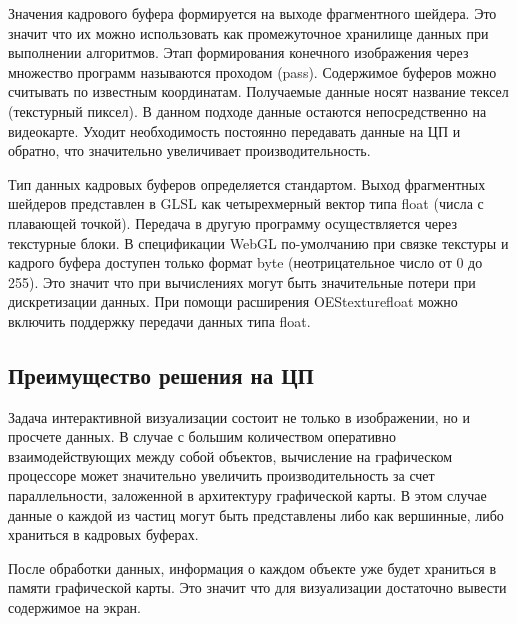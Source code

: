 Значения кадрового буфера формируется на выходе фрагментного шейдера. Это значит что их можно 
использовать как промежуточное хранилище данных при выполнении алгоритмов. Этап формирования 
конечного изображения через множество программ называются проходом (pass). Содержимое буферов 
можно считывать по известным координатам. Получаемые данные носят название тексел (текстурный 
пиксел). В данном подходе данные остаются непосредственно на видеокарте. Уходит необходимость
постоянно передавать данные на ЦП и обратно, что значительно увеличивает производительность.

Тип данных кадровых буферов определяется стандартом. Выход фрагментных шейдеров представлен в 
GLSL как четырехмерный вектор типа float (числа с плавающей точкой). Передача в другую программу
осуществляется через текстурные блоки. В спецификации WebGL по-умолчанию при связке текстуры
и кадрого буфера доступен только формат byte (неотрицательное число от 0 до 255). Это значит
что при вычислениях могут быть значительные потери при дискретизации данных. При помощи
расширения OES\textunderscore{}texture\textunderscore{}float можно включить поддержку передачи 
данных типа float.

\subsection{Преимущество решения на ЦП}

Задача интерактивной визуализации состоит не только в изображении, но и просчете данных.
В случае с большим количеством оперативно взаимодействующих между собой объектов, вычисление
на графическом процессоре может значительно увеличить производительность за счет параллельности,
заложенной в архитектуру графической карты. В этом случае данные о каждой из частиц могут быть
представлены либо как вершинные, либо храниться в кадровых буферах.

После обработки данных, информация о каждом объекте уже будет храниться в памяти графической карты.
Это значит что для визуализации достаточно вывести содержимое на экран.
